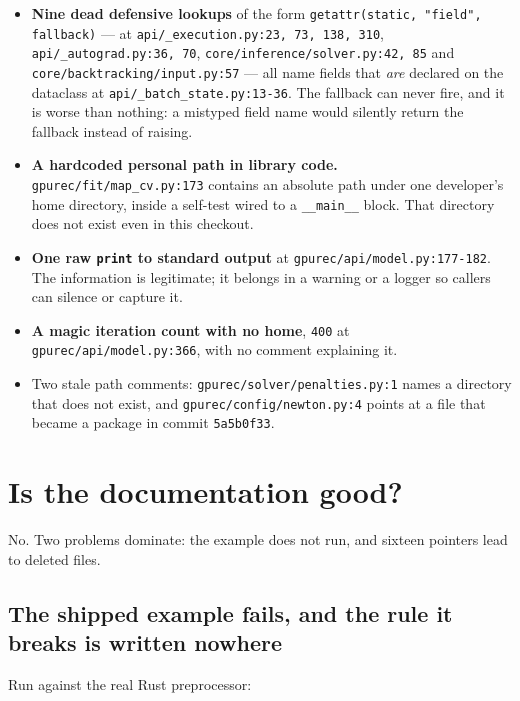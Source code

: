 \documentclass[11pt]{article}
\newcommand{\loc}[1]{\nolinkurl{#1}}
\begin{document}
\begin{itemize}
  \item \textbf{Nine dead defensive lookups} of the form
        \texttt{getattr(static, "field", fallback)} --- at
        \loc{api/\_execution.py:23, 73, 138, 310}, \loc{api/\_autograd.py:36, 70},
        \loc{core/inference/solver.py:42, 85} and
        \loc{core/backtracking/input.py:57} --- all name fields that
        \emph{are} declared on the dataclass at \loc{api/\_batch\_state.py:13-36}.
        The fallback can never fire, and it is worse than nothing: a mistyped
        field name would silently return the fallback instead of raising.
  \item \textbf{A hardcoded personal path in library code.}
        \loc{gpurec/fit/map\_cv.py:173} contains an absolute path under one
        developer's home directory, inside a self-test wired to a
        \texttt{\_\_main\_\_} block.  That directory does not exist even in this
        checkout.
  \item \textbf{One raw \texttt{print} to standard output} at
        \loc{gpurec/api/model.py:177-182}.  The information is legitimate; it
        belongs in a warning or a logger so callers can silence or capture it.
  \item \textbf{A magic iteration count with no home}, \texttt{400} at
        \loc{gpurec/api/model.py:366}, with no comment explaining it.
  \item Two stale path comments: \loc{gpurec/solver/penalties.py:1} names a
        directory that does not exist, and \loc{gpurec/config/newton.py:4}
        points at a file that became a package in commit \texttt{5a5b0f33}.
\end{itemize}

\section{Is the documentation good?}

No.  Two problems dominate: the example does not run, and sixteen pointers lead
to deleted files.

\subsection{The shipped example fails, and the rule it breaks is written nowhere}
\label{sec:docs-example}

Run against the real Rust preprocessor:
\end{document}
